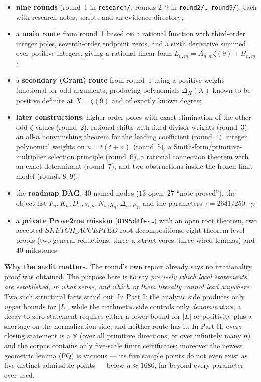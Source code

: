 \documentclass[11pt]{article}
\begin{document}
\begin{itemize}[leftmargin=1.4em]
\item \textbf{nine rounds} (round~1 in \texttt{research/}, rounds 2--9 in \texttt{round2/}\dots
      \texttt{round9/}), each with research notes, scripts and an evidence directory;
\item a \textbf{main route} from round~1 based on a rational function with third-order integer poles,
      seventh-order endpoint zeros, and a sixth derivative summed over positive integers, giving a
      rational linear form $L_{n,m}=A_{n,m}\zeta(9)+B_{n,m}$;
\item a \textbf{secondary (Gram) route} from round~1 using a positive weight functional for odd
      arguments, producing polynomials $\Delta_K(X)$ known to be positive definite at $X=\zeta(9)$
      and of exactly known degree;
\item \textbf{later constructions}: higher-order poles with exact elimination of the other odd
      $\zeta$ values (round~2), rational shifts with fixed divisor weights (round~3), an
      all-$n$ nonvanishing theorem for the leading coefficient (round~4), integer polynomial weights
      on $u=t(t+n)$ (round~5), a Smith-form/primitive-multiplier selection principle (round~6), a
      rational connection theorem with an exact determinant (round~7), and two obstructions inside
      the frozen limit model (rounds 8--9);
\item the \textbf{roadmap DAG}: $40$ named nodes ($13$ open, $27$ ``note-proved''), the object list
      $F_n,K_n,D_n,s_{i,n},N_n,g_n,\Delta_n,\mu_n$ and the parameters $\tau=2641/250$, $\gamma$;
\item a \textbf{private Prove2me mission} (\texttt{8195d8fe-\dots}) with an open root theorem, two
      accepted $SKETCH\_ACCEPTED$ root decompositions, eight theorem-level proofs (two general
      reductions, three abstract cores, three wired lemmas) and $40$ milestones.
\end{itemize}

\textbf{Why the audit matters.} The round's own report already says no irrationality proof was
obtained. The purpose here is to say \emph{precisely which local statements are established, in what
sense, and which of them literally cannot lead anywhere}. Two such structural facts stand out. In
Part I: the analytic side produces only \emph{upper} bounds for $|L|$, while the arithmetic side
controls only \emph{denominators}; a decay-to-zero statement requires either a lower bound for $|L|$
or positivity plus a shortage on the normalization side, and neither route has it. In Part II: every
closing statement is a $\forall$ (over all primitive directions, or over infinitely many $n$) and the
corpus contains only five-scale finite certificates; moreover the newest geometric lemma (FQ) is
vacuous --- its five sample points do not even exist as five distinct admissible points --- below
$n\approx1686$, far beyond every parameter ever used.
\end{document}
